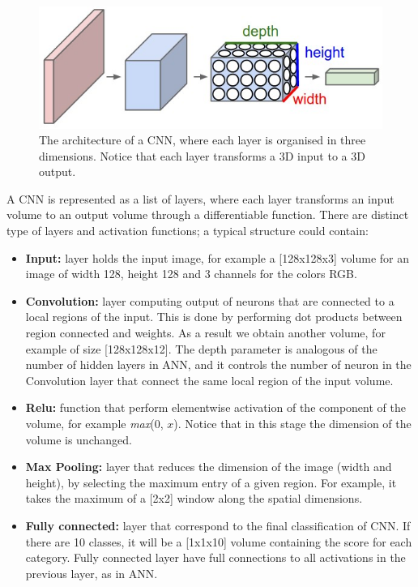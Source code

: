\documentclass{article} %
\begin{document}
\begin{figure}[htbp]
	\centering
	\includegraphics[scale=0.5]{cnn.png}
	\caption{The architecture of a CNN, where each layer is organised in three dimensions. Notice that each layer transforms a 3D input to a 3D output.}
	\label{CNN}
\end{figure}
\vspace{0.3cm}
A CNN is represented as a list of layers, where each layer transforms an input volume to an output volume through a differentiable function. There are distinct type of layers and activation functions; a typical structure could contain:
\begin{itemize}
	\item \textbf{Input:} layer holds the input image, for example a [128x128x3] volume for an image of width 128, height 128 and 3 channels for the colors RGB. 
	\item \textbf{Convolution:} layer computing output of neurons that are connected to a local regions of the input. This is done by performing dot products between region connected and weights. As a result we obtain another volume, for example of size [128x128x12]. The depth parameter is analogous of the number of hidden layers in ANN, and it controls the number of neuron in the Convolution layer that connect the same local region of the input volume. 
	\item \textbf{Relu:} function that perform elementwise activation of the component of the volume, for example \textit{max}(0, $x$). Notice that in this stage the dimension of the volume is unchanged. 
	\item \textbf{Max Pooling:} layer that reduces the dimension of the image (width and height), by selecting the maximum entry of a given region. For example, it takes the maximum of a [2x2] window along the spatial dimensions.
	\item \textbf{Fully connected:} layer that correspond to the final classification of CNN. If there are 10 classes, it will be a [1x1x10] volume containing the score for each category. Fully connected layer have full connections to all activations in the previous layer, as in ANN. 
\end{itemize}
\end{document}
